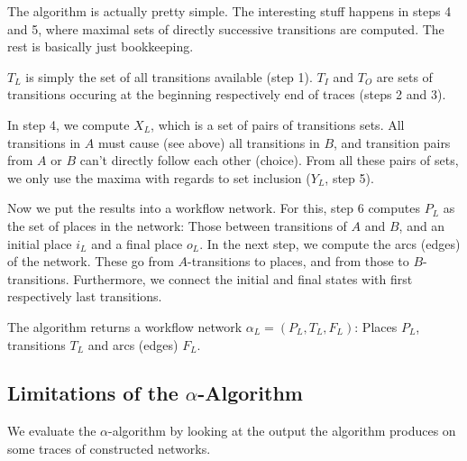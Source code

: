 \documentclass[english]{panikzettel}
\begin{document}
The algorithm is actually pretty simple.
The interesting stuff happens in steps 4 and 5, where maximal sets of directly successive transitions are computed.
The rest is basically just bookkeeping.

$T_L$ is simply the set of all transitions available (step 1).
$T_I$ and $T_O$ are sets of transitions occuring at the beginning respectively end of traces (steps 2 and 3).

In step 4, we compute $X_L$, which is a set of pairs of transitions sets.
All transitions in $A$ must cause (see above) all transitions in $B$, and transition pairs from $A$ or $B$ can't directly follow each other (choice).
From all these pairs of sets, we only use the maxima with regards to set inclusion ($Y_L$, step 5).

Now we put the results into a workflow network.
For this, step 6 computes $P_L$ as the set of places in the network: Those between transitions of $A$ and $B$, and an initial place $i_L$ and a final place $o_L$.
In the next step, we compute the arcs (edges) of the network.
These go from $A$-transitions to places, and from those to $B$-transitions.
Furthermore, we connect the initial and final states with first respectively last transitions.

The algorithm returns a workflow network $\alpha_L = (P_L, T_L, F_L)$: Places $P_L$, transitions $T_L$ and arcs (edges) $F_L$.

\subsection[Limitations of the Alpha-Algorithm]{Limitations of the $\alpha$-Algorithm}

We evaluate the $\alpha$-algorithm by looking at the output the algorithm produces on some traces of constructed networks.
\end{document}
